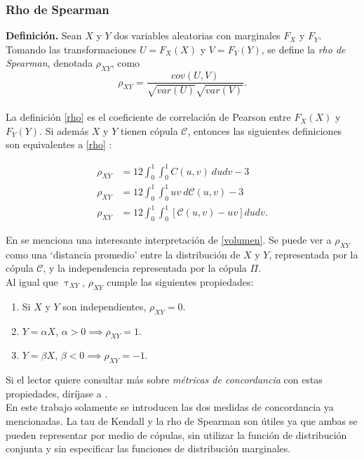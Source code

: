 \documentclass[11pt,a4paper]{article}
\newcommand{\C}{\mathcal{C}}
\begin{document}
\subsubsection*{Rho de Spearman}

\textbf{Definición.} Sean $X$ y $Y$ dos variables aleatorias con marginales $F_X$ y $F_Y$. Tomando las transformaciones $U = F_X(X)$ y $V = F_Y(Y)$, se define la \textit{rho de Spearman}, denotada $\rho_{XY}$, como
\begin{equation} \label{rho}
\rho_{XY} = \frac{cov(U, V)}{\sqrt{var(U)}\sqrt{var(V)}}.
\end{equation}\\

La definición \eqref{rho} es el coeficiente de correlación de Pearson entre $F_X(X)$ y $F_Y(Y)$. Si además $X$ y $Y$ tienen cópula $\C$, entonces las siguientes definiciones son equivalentes a \eqref{rho} \citep{nelsen}:

\begin{align}
\rho_{XY} &= 12\int_0^1 \int_0^1 C(u, v) \ dudv-3\\
\rho_{XY} &= 12\int_0^1 \int_0^1 uv \ d\C(u,v)-3\\
\rho_{XY} &= 12\int_0^1\int_0^1 \left[ \C(u, v) - uv \right] dudv \label{volumen}.
\end{align}

En \citet{nelsen} se menciona una interesante interpretación de \eqref{volumen}. Se puede ver a $\rho_{XY}$ como una `distancia promedio' entre la distribución de $X$ y $Y$, representada por la cópula $\C$, y la independencia representada por la cópula $\Pi$.\\

Al igual que $\uptau_{XY}$, $\rho_{XY}$ cumple las siguientes propiedades:

\begin{enumerate}
\item Si $X$ y $Y$ son independientes, $\rho_{XY} = 0$.
\item $Y = \alpha X$, $\alpha > 0 \implies \rho_{XY} = 1$.
\item $Y = \beta X$, $\beta < 0 \implies \rho_{XY} = -1$.
\end{enumerate}

Si el lector quiere consultar más sobre \textit{métricas de concordancia} con estas propiedades, diríjase a \citet{nelsen}.\\

En este trabajo solamente se introducen las dos medidas de concordancia ya mencionadas. La tau de Kendall y la rho de Spearman son útiles ya que ambas se pueden representar por medio de cópulas, sin utilizar la función de distribución conjunta y sin especificar las funciones de distribución marginales.\\
\end{document}

